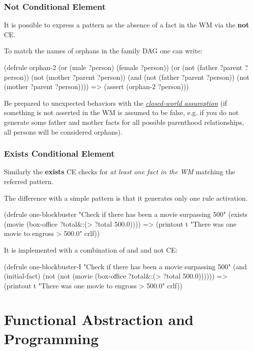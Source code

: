 \documentclass[xcolor={usenames,dvipsnames,svgnames}, compress]{beamer}
\begin{document}
\begin{frame}[fragile]
  \frametitle{Not Conditional Element}
  It is possible to express a pattern as the absence of a fact in the
  WM via the \textbf{not} CE.\par
  To match the names of orphans in the family DAG one can write:
  \begin{clips-code}[numbers=none]
    (defrule orphan-2
         (or (male ?person)
             (female ?person))
         (or (not (father ?parent ?person))
             (not (mother ?parent ?person))
             (and
                 (not (father ?parent ?person))
                 (not (mother ?parent ?person))))
         =>
         (assert (orphan-2 ?person)))
       \end{clips-code}

       Be prepared to unexpected behaviors with the
       \href{http://en.wikipedia.org/wiki/Closed-world_assumption}{\emph{closed-world
           assumption}} (if something is not asserted in the WM is
       assumed to be false, e.g. if you do not generate some father
       and mother facts for all possible parenthood relationships, all
       persons will be considered orphans).    
\end{frame}

\begin{frame}[fragile]
  \frametitle{Exists Conditional Element}
  Similarly the \textbf{exists} CE checks for \emph{at least one fact
    in the WM} matching the
  referred pattern.\par\bigskip
  The difference with a simple pattern is that it
  generates only one rule activation.
  \begin{clips-code}[numbers=none]
    (defrule one-blockbuster
        "Check if there has been a movie surpassing 500"
        (exists (movie (box-office ?total&:(> ?total 500.0))))
        =>
        (printout t "There was one movie to engross > 500.0" crlf))
  \end{clips-code}
  It is implemented with a combination of and and not CE:
  \begin{clips-code}[numbers=none]
    (defrule one-blockbuster-I
        "Check if there has been a movie surpassing 500"
        (and (initial-fact)
            (not (not (movie (box-office ?total&:(> ?total 500.0))))))
            =>
            (printout t "There was one movie to engross > 500.0" crlf))
  \end{clips-code}
\end{frame}

\section{Functional Abstraction and Programming}
{
  \begin{frame}
    \sectionpage
  \end{frame}
}
\end{document}
